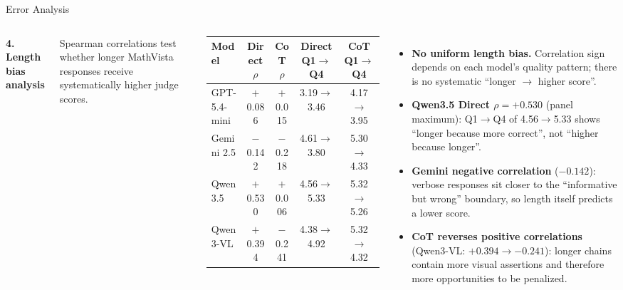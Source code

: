 \documentclass[9pt,aspectratio=169]{beamer}
\begin{document}
\begin{frame}{Error Analysis}
  \begin{columns}[T,onlytextwidth]
      \textbf{\small 4. Length bias analysis}

      \vspace{0.15em}
      \scriptsize
      Spearman correlations test whether longer MathVista responses
      receive systematically higher judge scores.

      \vspace{0.2em}
      \centering
      \setlength{\tabcolsep}{2.2pt}
      \renewcommand{\arraystretch}{0.88}
      \begin{tabular}{lcccc}
        \toprule
        Model & Direct $\rho$ & CoT $\rho$ & Direct Q1$\to$Q4 & CoT Q1$\to$Q4 \\
        \midrule
        GPT-5.4-mini & $+$0.086 & $+$0.015 & 3.19$\to$3.46 & 4.17$\to$3.95 \\
        Gemini 2.5 & $-$0.142 & $-$0.218 & 4.61$\to$3.80 & 5.30$\to$4.33 \\
        Qwen3.5 & \alert{$+$0.530} & $+$0.006 & \alert{4.56$\to$5.33} & 5.32$\to$5.26 \\
        Qwen3-VL & $+$0.394 & \alert{$-$0.241} & 4.38$\to$4.92 & 5.32$\to$4.32 \\
        \bottomrule
      \end{tabular}

      \vspace{0.3em}
      \raggedright
      \begin{itemize}\setlength{\itemsep}{0.15em}\setlength{\parskip}{0pt}
        \item \textbf{No uniform length bias.}
              Correlation sign depends on each model's quality pattern;
              there is no systematic ``longer $\to$ higher score''.
        \item \textbf{Qwen3.5 Direct $\rho = +0.530$} (panel maximum):
              Q1$\to$Q4 of 4.56$\to$5.33 shows
              ``longer because more correct'', not ``higher because longer''.
        \item \textbf{Gemini negative correlation} ($-0.142$):
              verbose responses sit closer to the
              ``informative but wrong'' boundary,
              so length itself predicts a lower score.
        \item \textbf{CoT reverses positive correlations}
              (Qwen3-VL: $+0.394 \to -0.241$):
              longer chains contain more visual assertions
              and therefore more opportunities to be penalized.
      \end{itemize}


\end{columns}
\end{frame}
\end{document}
